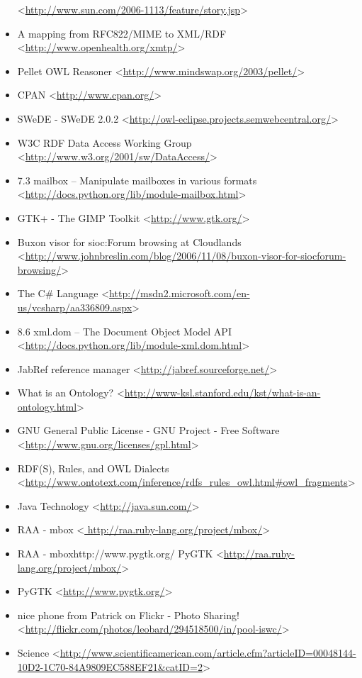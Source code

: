 \begin{itemize}
 <\url{http://www.sun.com/2006-1113/feature/story.jsp}>
 \item A mapping from RFC822/MIME to XML/RDF
 <\url{http://www.openhealth.org/xmtp/}>
 \item Pellet OWL Reasoner
 <\url{http://www.mindswap.org/2003/pellet/}>
 \item CPAN
 <\url{http://www.cpan.org/}>
 \item SWeDE - SWeDE 2.0.2
 <\url{http://owl-eclipse.projects.semwebcentral.org/}>
 \item W3C RDF Data Access Working Group
 <\url{http://www.w3.org/2001/sw/DataAccess/}>
 \item 7.3 mailbox -- Manipulate mailboxes in various formats
 <\url{http://docs.python.org/lib/module-mailbox.html}>
 \item GTK+ - The GIMP Toolkit
 <\url{http://www.gtk.org/}>
 \item Buxon visor for sioc:Forum browsing at Cloudlands
 <\url{http://www.johnbreslin.com/blog/2006/11/08/buxon-visor-for-siocforum-browsing/}>
 \item The C\# Language
 <\url{http://msdn2.microsoft.com/en-us/vcsharp/aa336809.aspx}>
 \item 8.6 xml.dom -- The Document Object Model API
 <\url{http://docs.python.org/lib/module-xml.dom.html}>
 \item JabRef reference manager
 <\url{http://jabref.sourceforge.net/}>
 \item What is an Ontology?
 <\url{http://www-ksl.stanford.edu/kst/what-is-an-ontology.html}>
 \item GNU General Public License - GNU Project - Free Software
 <\url{http://www.gnu.org/licenses/gpl.html}>
 \item RDF(S), Rules, and OWL Dialects <\url{http://www.ontotext.com/inference/rdfs_rules_owl.html#owl_fragments}>
 \item Java Technology
 <\url{http://java.sun.com/}>
 \item RAA - mbox
 <\url{ http://raa.ruby-lang.org/project/mbox/}>
 \item RAA - mboxhttp://www.pygtk.org/ PyGTK
 <\url{http://raa.ruby-lang.org/project/mbox/}>
 \item PyGTK
 <\url{http://www.pygtk.org/}>
 \item nice phone from Patrick on Flickr - Photo Sharing!
 <\url{http://flickr.com/photos/leobard/294518500/in/pool-iswc/}>
 \item Science
 <\url{http://www.scientificamerican.com/article.cfm?articleID=00048144-10D2-1C70-84A9809EC588EF21&catID=2}>

\end{itemize}
